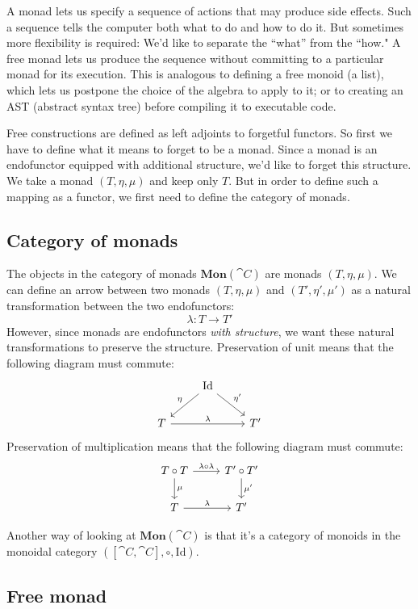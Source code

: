 \documentclass[DaoFP]{subfiles}
\begin{document}
A monad lets us specify a sequence of actions that may produce side effects. Such a sequence tells the computer both what to do and how to do it. But sometimes more flexibility is required: We'd like to separate the ``what'' from the ``how." A free monad lets us produce the sequence without committing to a particular monad for its execution. This is analogous to defining a free monoid (a list), which lets us postpone the choice of the algebra to apply to it; or to creating an AST (abstract syntax tree) before compiling it to executable code.

Free constructions are defined as left adjoints to forgetful functors. So first we have to define what it means to forget to be a monad. Since a monad is an endofunctor equipped with additional structure, we'd like to forget this structure. We take a monad $(T, \eta, \mu)$ and keep only $T$. But in order to define such a mapping as a functor, we first need to define the category of monads.

\subsection{Category of monads}

The objects in the category of monads $\mathbf{Mon}(\cat C)$ are monads $(T, \eta, \mu)$. We can define an arrow between two monads $(T, \eta, \mu)$ and $(T', \eta', \mu')$ as a natural transformation between the two endofunctors:
\[ \lambda \colon T \to T' \]
However, since monads are endofunctors \emph{with structure}, we want these natural transformations to preserve the structure. Preservation of unit means that the following diagram must commute:
\[
 \begin{tikzcd}
&\text{Id}
 \arrow[ld, "\eta"']
 \arrow[rd, "\eta'"]
 \\
 T
 \arrow[rr, "\lambda"]
 && T'
 \end{tikzcd}
\]
Preservation of multiplication means that the following diagram must commute:
\[
 \begin{tikzcd}
 T \circ T
 \arrow[r, "\lambda \circ \lambda"]
 \arrow[d, "\mu"]
 & T' \circ T'
 \arrow[d, "\mu'"]
 \\
 T
 \arrow[r, "\lambda"]
 & T'
 \end{tikzcd}
\]

Another way of looking at $\mathbf{Mon}(\cat C)$ is that it's a category of monoids in the monoidal category $([\cat C, \cat C], \circ, \text{Id})$. 

\subsection{Free monad}
\end{document}
